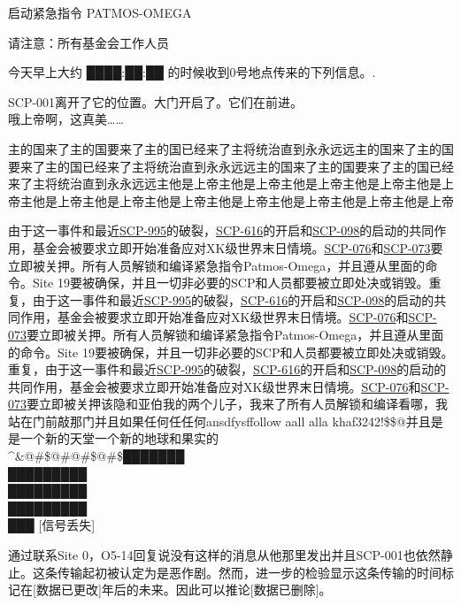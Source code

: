 \begin{scpbox}
启动紧急指令 PATMOS-OMEGA

请注意：所有基金会工作人员

今天早上大约 ████:██:██ 的时候收到0号地点传来的下列信息。.

SCP-001离开了它的位置。大门开启了。它们在前进。\\
哦上帝啊，这真美……

主的国来了主的国要来了主的国已经来了主将统治直到永永远远主的国来了主的国要来了主的国已经来了主将统治直到永永远远主的国来了主的国要来了主的国已经来了主将统治直到永永远远主他是上帝主他是上帝主他是上帝主他是上帝主他是上帝主他是上帝主他是上帝主他是上帝主他是上帝主他是上帝主他是上帝主他是上帝

由于这一事件和最近\hyperref[chap:SCP-995]{SCP-995}的破裂，\hyperref[chap:SCP-616]{SCP-616}的开启和\hyperref[chap:SCP-098]{SCP-098}的启动的共同作用，基金会被要求立即开始准备应对XK级世界末日情境。\hyperref[chap:SCP-076]{SCP-076}和\hyperref[chap:SCP-073]{SCP-073}要立即被关押。所有人员解锁和编译紧急指令Patmos-Omega，并且遵从里面的命令。Site 19要被确保，并且一切非必要的SCP和人员都要被立即处决或销毁。重复，由于这一事件和最近\hyperref[chap:SCP-995]{SCP-995}的破裂，\hyperref[chap:SCP-616]{SCP-616}的开启和\hyperref[chap:SCP-098]{SCP-098}的启动的共同作用，基金会被要求立即开始准备应对XK级世界末日情境。\hyperref[chap:SCP-076]{SCP-076}和\hyperref[chap:SCP-073]{SCP-073}要立即被关押。所有人员解锁和编译紧急指令Patmos-Omega，并且遵从里面的命令。Site 19要被确保，并且一切非必要的SCP和人员都要被立即处决或销毁。重复，由于这一事件和最近\hyperref[chap:SCP-995]{SCP-995}的破裂，\hyperref[chap:SCP-616]{SCP-616}的开启和\hyperref[chap:SCP-098]{SCP-098}的启动的共同作用，基金会被要求立即开始准备应对XK级世界末日情境。\hyperref[chap:SCP-076]{SCP-076}和\hyperref[chap:SCP-073]{SCP-073}要立即被关押该隐和亚伯我的两个儿子，我来了所有人员解锁和编译看哪，我站在门前敲那门并且如果任何任任何ansdfysffollow aall alla khaf3242!\$\$@并且是是一个新的天堂一个新的地球和果实的 \\
\^{}\&@\#\$@\#@\#\$@\#\$███████ \\
█████████ \\
█████████ \\
█████████ \\
███ [信号丢失]
\end{scpbox}

通过联系Site 0，O5-14回复说没有这样的消息从他那里发出并且SCP-001也依然静止。这条传输起初被认定为是恶作剧。然而，进一步的检验显示这条传输的时间标记在[数据已更改]年后的未来。因此可以推论[数据已删除]。

\hr
